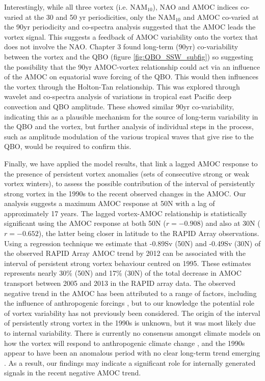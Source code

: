 Interestingly, while all three vortex (i.e. NAM$_{10}$), NAO and AMOC indices co-varied at the 30 and 50 yr periodicities, only the NAM$_{10}$ and AMOC co-varied at the 90yr periodicity and co-spectra analysis suggested that the AMOC leads the vortex signal. This suggests a feedback of AMOC variability onto the vortex that does not involve the NAO. Chapter 3 found long-term (90yr) co-variability between the vortex and the QBO (figure \ref{fig:QBO_SSW_subfig}) so suggesting the possibility that the 90yr AMOC-vortex relationship could act via an influence of the AMOC on equatorial wave forcing of the QBO. This would then influences the vortex through the Holton-Tan relationship.  This was explored through wavelet and co-spectra analysis of variations in tropical east Pacific deep convection and QBO amplitude. These showed similar 90yr co-variability, indicating this as a plausible mechanism for the source of long-term variability in the QBO and the vortex, but further analysis of individual steps in the process, such as amplitude modulation of the various tropical waves that give rise to the QBO, would be required to confirm this.

Finally, we have applied the model results, that link a lagged AMOC response to the presence of persistent vortex anomalies (sets of consecutive strong or weak vortex winters), to assess the possible contribution  of the interval of persistently strong vortex in the 1990s to the recent observed changes in the AMOC. Our analysis suggests a maximum AMOC response at 50N with a lag of approximately 17 years. The lagged vortex-AMOC relationship is statistically significant using the AMOC response at both 50N ($r = -0.908$) and also at 30N ($r = -0.652$), the latter being closer in latitude to the RAPID Array observations. Using a regression technique we estimate that -0.89Sv (50N) and -0.49Sv (30N) of the observed RAPID Array AMOC trend by 2012 can be associated with the interval of persistent strong vortex behaviour centred on 1995. These estimates represents nearly 30\% (50N) and 17\% (30N) of the total decrease in AMOC transport between 2005 and 2013 in the RAPID array data. The observed negative trend in the AMOC has been attributed to a range of factors, including the influence of anthropogenic forcings \citep{caesarObserved2018, caesarCurrent2021}, but to our knowledge the potential role of vortex variability has not previously been considered. The origin of the interval of persistently strong vortex in the 1990s is unknown, but it was most likely due to internal variability. There is currently no consensus amongst climate models on how the vortex will respond to anthropogenic climate change \citep{ayarzaguenaUncertainty2020b}, and the 1990s appear to have been an anomalous period with no clear long-term trend emerging \citep{domeisenEstimating2019d}. As a result, our findings may indicate a significant role for internally generated signals in the recent negative AMOC trend. 

